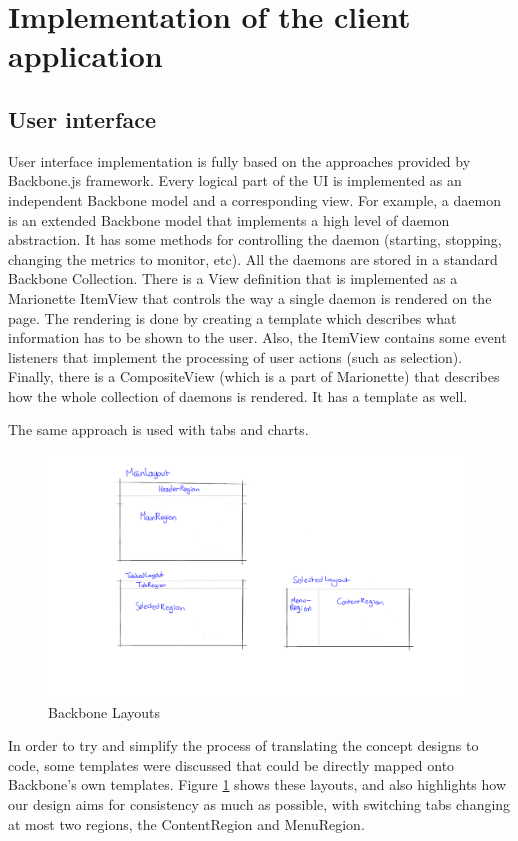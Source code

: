 \documentclass{l3proj}
\begin{document}
\section{Implementation of the client application}

\subsection{User interface}

User interface implementation is fully based on the approaches provided by Backbone.js framework. Every logical part of the UI is implemented as an independent Backbone model and a corresponding view. For example, a daemon is an extended Backbone model that implements a high level of daemon abstraction. It has some methods for controlling the daemon (starting, stopping, changing the metrics to monitor, etc). All the daemons are stored in a standard Backbone Collection. There is a View definition that is implemented as a Marionette ItemView that controls the way a single daemon is rendered on the page. The rendering is done by creating a template which describes what information has to be shown to the user. Also, the ItemView contains some event listeners that implement the processing of user actions (such as selection). Finally, there is a CompositeView (which is a part of Marionette) that describes how the whole collection of daemons is rendered. It has a template as well.

The same approach is used with tabs and charts.

\begin{figure}[H]
\centering
\includegraphics[width=110mm]{Concept_Designs/BackboneLayouts.png}
\caption{Backbone Layouts}
\label{fig:BackboneLayouts}
\end{figure}

In order to try and simplify the process of translating the concept designs to code, some templates were discussed that could be directly mapped onto Backbone's own templates. Figure \ref{fig:BackboneLayouts} shows these layouts, and also highlights how our design aims for consistency as much as possible, with switching tabs changing at most two regions, the ContentRegion and MenuRegion.
\end{document}

